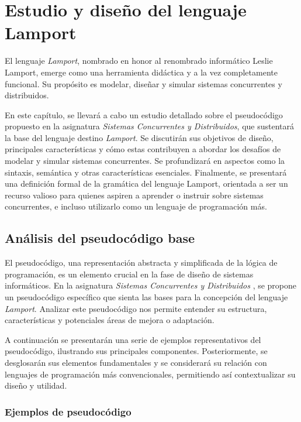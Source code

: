 \chapter{\textbf{Estudio y diseño del lenguaje Lamport}}\label{chapter:lamportDesign}
El lenguaje \textit{Lamport}, nombrado en honor al renombrado informático Leslie Lamport, emerge como una herramienta didáctica y a la vez completamente funcional. Su propósito es modelar, diseñar y simular sistemas concurrentes y distribuidos.

En este capítulo, se llevará a cabo un estudio detallado sobre el pseudocódigo propuesto en la asignatura \textit{Sistemas Concurrentes y Distribuidos}, que sustentará la base del lenguaje destino \textit{Lamport}. Se discutirán sus objetivos de diseño, principales características y cómo estas contribuyen a abordar los desafíos de modelar y simular sistemas concurrentes. Se profundizará en aspectos como la sintaxis, semántica y otras características esenciales. Finalmente, se presentará una definición formal de la gramática del lenguaje Lamport, orientada a ser un recurso valioso para quienes aspiren a aprender o instruir sobre sistemas concurrentes, e incluso utilizarlo como un lenguaje de programación más.

\section{Análisis del pseudocódigo base}\label{sec:pseudoAnalisis}
El pseudocódigo, una representación abstracta y simplificada de la lógica de programación, es un elemento crucial en la fase de diseño de sistemas informáticos. En la asignatura \textit{Sistemas Concurrentes y Distribuidos} \cite{capel2020sistemas}, se propone un pseudocódigo específico que sienta las bases para la concepción del lenguaje \textit{Lamport}. Analizar este pseudocódigo nos permite entender su estructura, características y potenciales áreas de mejora o adaptación.

A continuación se presentarán una serie de ejemplos representativos del pseudocódigo, ilustrando sus principales componentes. Posteriormente, se desglosarán sus elementos fundamentales y se considerará su relación con lenguajes de programación más convencionales, permitiendo así contextualizar su diseño y utilidad.

\newpage

\subsection{Ejemplos de pseudocódigo}\label{subsec:pseudoAnalisisEjemplos}

